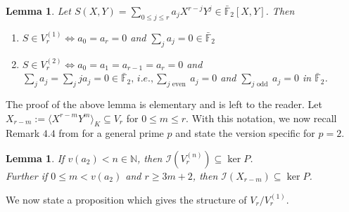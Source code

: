 \documentclass[11pt, reqno]{amsart}
\numberwithin{equation}{section}
\newcommand\N{\mathbb{N}}
\newcommand{\F}{\mathbb{F}}
\newtheorem{lemma}[thm]{Lemma}
\theoremstyle{definition}
\theoremstyle{remark}
\theoremstyle{definition}
\theoremstyle{remark}
\theoremstyle{remark}
\begin{document}
\begin{lemma}\label{Vr*}
Let $S(X,Y) = \displaystyle\sum_{0\leq j \leq r}a_{j}X^{r-j}Y^{j} \in \bar{\mathbb{F}}_{2}[X,Y]$. Then 
\begin{enumerate}
	\item	$S \in V_{r}^{(1)} \iff a_{0} = a_{r} = 0$ and $\sum_{j}a_{j} = 0 \in \bar{\mathbb{F}}_{2}$\\
	\item	$S \in V_{r}^{(2)} \iff a_{0} = a_{1} = a_{r-1}= a_{r} = 0$ and\\ $\displaystyle\sum_{j}a_{j} = \sum_{j}ja_{j}=0 \in \bar{\F}_{2},        \,   i.e.,\displaystyle\sum_{j \text{ even }}a_{j} = 0$ and $\displaystyle\sum_{j  \text{ odd }}a_{j} = 0$ in $\bar{\mathbb{F}}_{2}$.
\end{enumerate}	
\end{lemma}
The proof of the above lemma is elementary and is left to the reader. Let $X_{r-m}:=\langle X^{r-m}Y^{m}  \rangle_K\subseteq V_r$ for $0\leq m \leq r$. With this notation, we now recall Remark $4.4$  from \cite{[BG09]} for a general prime $p$ and state the version specific for $p=2$.

\begin{lemma}\label{RemarkBG09}
     If $v(a_2)<n\in\N$, %
     then $\mathcal{I} (V_r^{(n)})\subseteq\ker P$.\\
     Further if $0\leq m< v(a_2)$ and $r\geq 3m+2$, then $\mathcal{I}( X_{r-m})\subseteq\ker P$.
\end{lemma}



We now state a proposition which gives the structure of $V_{r}/V_{r}^{(1)}$.
\end{document}
